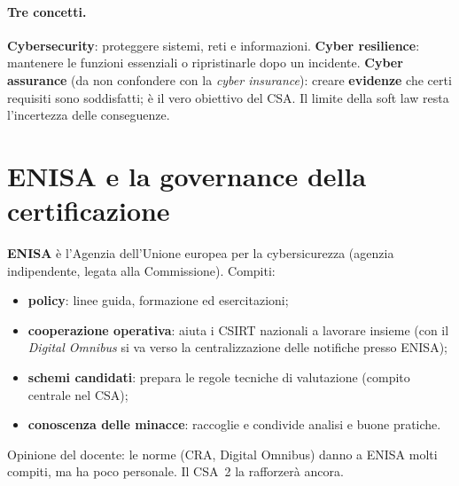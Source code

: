 \paragraph{Tre concetti.} \textbf{Cybersecurity}: proteggere sistemi, reti e informazioni.
\textbf{Cyber resilience}: mantenere le funzioni essenziali o ripristinarle dopo un incidente.
\textbf{Cyber assurance} (da non confondere con la \emph{cyber insurance}): creare \textbf{evidenze} che
certi requisiti sono soddisfatti; è il vero obiettivo del CSA. Il limite della soft law resta
l'incertezza delle conseguenze.

\section{ENISA e la governance della certificazione}
\textbf{ENISA} è l'Agenzia dell'Unione europea per la cybersicurezza (agenzia indipendente, legata alla
Commissione). Compiti:
\begin{itemize}
  \item \textbf{policy}: linee guida, formazione ed esercitazioni;
  \item \textbf{cooperazione operativa}: aiuta i CSIRT nazionali a lavorare insieme (con il
    \emph{Digital Omnibus} si va verso la centralizzazione delle notifiche presso ENISA);
  \item \textbf{schemi candidati}: prepara le regole tecniche di valutazione (compito centrale nel CSA);
  \item \textbf{conoscenza delle minacce}: raccoglie e condivide analisi e buone pratiche.
\end{itemize}
Opinione del docente: le norme (CRA, Digital Omnibus) danno a ENISA molti compiti, ma ha poco personale.
Il CSA~2 la rafforzerà ancora.

